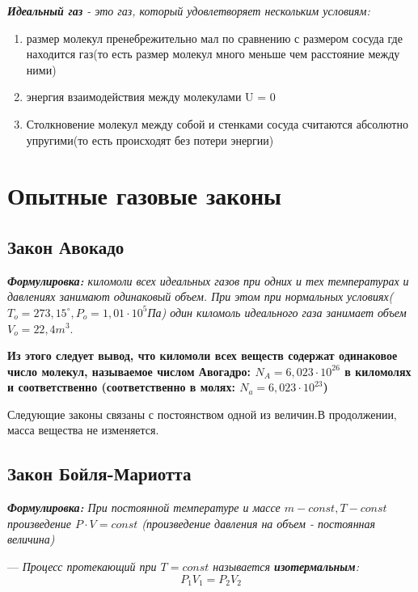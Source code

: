  \textit{\textbf{Идеальный газ} - это газ, который удовлетворяет нескольким условиям:}
\begin{enumerate}
    \item размер молекул пренебрежительно мал по сравнению с размером сосуда где находится газ(то есть размер молекул много меньше чем расстояние между ними)
    \item энергия взаимодействия между молекулами U = 0
    \item Столкновение молекул между собой и стенками сосуда считаются абсолютно упругими(то есть происходят без потери энергии)
\end{enumerate}
\section{Опытные газовые законы}

\subsection{Закон Авокадо}
\textit{\textbf{Формулировка:} киломоли всех идеальных газов при одних и тех температурах и давлениях занимают одинаковый объем. При этом при нормальных условиях($T_o = 273,15^{\circ}, P_o = 1,01 \cdot 10^5$Па) один киломоль идеального газа занимает объем $V_o = 22,4m^3$}.

\vspace{5px}

\textbf{Из этого следует вывод, что киломоли всех веществ содержат одинаковое число молекул, называемое числом Авогадро:
    $N_A = 6,023 \cdot 10^{26}$ в киломолях и соответственно (соответственно в молях: $N_a = 6,023 \cdot 10^{23}$)}

\vspace{5px}

Следующие законы связаны с постоянством одной из величин.В продолжении, масса вещества не изменяется.

\subsection{Закон Бойля-Мариотта}
\textit{\textbf{Формулировка:} При постоянной температуре и массе $m - const, T- const$ произведение $P \cdot V = const$ (произведение давления на объем - постоянная величина)}

\vspace{5px}

--- \textit{Процесс протекающий при $T = const$ называется \textbf{изотермальным}: }
\[ P_1V_1 = P_2V_2\]

